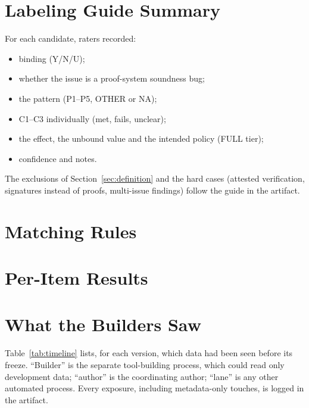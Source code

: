 \section{Labeling Guide Summary}\label{app:labels}
For each candidate, raters recorded:
\begin{itemize}
\item binding (Y/N/U);
\item whether the issue is a proof-system soundness bug;
\item the pattern (P1--P5, OTHER or NA);
\item C1--C3 individually (met, fails, unclear);
\item the effect, the unbound value and the intended policy (FULL tier);
\item confidence and notes.
\end{itemize}
The exclusions of Section~\ref{sec:definition} and the hard cases (attested
verification, signatures instead of proofs, multi-issue findings) follow the
guide in the artifact.

\section{Matching Rules}\label{app:matching}

\section{Per-Item Results}\label{app:items}

\section{What the Builders Saw}\label{app:timeline}
Table~\ref{tab:timeline} lists, for each version, which data had been seen
before its freeze. ``Builder'' is the separate tool-building process, which
could read only development data; ``author'' is the coordinating author;
``lane'' is any other automated process. Every exposure, including
metadata-only touches, is logged in the artifact.

